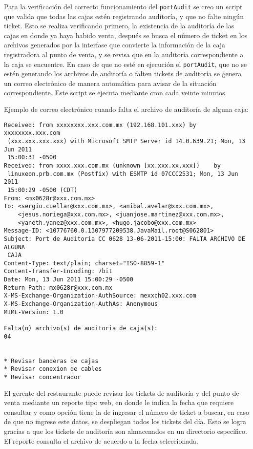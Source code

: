 Para la verificación del correcto funcionamiento del \texttt{portAudit} se creo un script que valida que todas las cajas estén registrando auditoría, y que no falte ningún ticket. Esto se realiza verificando primero, la existencia de la auditoría de las cajas en donde ya haya habido venta, después se busca el número de ticket en los archivos generados por la interfase que convierte la información de la caja registradora al punto de venta, y se revisa que en la auditoría correspondiente a la caja se encuentre. En caso de que no esté en ejecución el \texttt{portAudit}, que no se estén generando los archivos de auditoría o falten tickets de auditoría se genera un correo electrónico de manera automática para avisar de la situación correspondiente. Este script se ejecuta mediante cron cada veinte minutos.

Ejemplo de correo electrónico cuando falta el archivo de auditoría de alguna caja:

\begin{Verbatim}[fontsize=\tiny]
Received: from xxxxxxxx.xxx.com.mx (192.168.101.xxx) by xxxxxxxx.xxx.com
 (xxx.xxx.xxx.xxx) with Microsoft SMTP Server id 14.0.639.21; Mon, 13 Jun 2011
 15:00:31 -0500
Received: from xxxx.xxx.com.mx (unknown [xx.xxx.xx.xxx])	by
 linuxeon.prb.com.mx (Postfix) with ESMTP id 07CCC2531;	Mon, 13 Jun 2011
 15:00:29 -0500 (CDT)
From: <mx0628r@xxx.com.mx>
To: <sergio.cuellar@xxx.com.mx>, <anibal.avelar@xxx.com.mx>,
	<jesus.noriega@xxx.com.mx>, <juanjose.martinez@xxx.com.mx>,
	<yaneth.yanez@xxx.com.mx>, <hugo.jacobo@xxx.com.mx>
Message-ID: <10776760.0.1307977209538.JavaMail.root@S062801>
Subject: Port de Auditoria CC 0628 13-06-2011-15:00: FALTA ARCHIVO DE ALGUNA
 CAJA
Content-Type: text/plain; charset="ISO-8859-1"
Content-Transfer-Encoding: 7bit
Date: Mon, 13 Jun 2011 15:00:29 -0500
Return-Path: mx0628r@xxx.com.mx
X-MS-Exchange-Organization-AuthSource: mexxch02.xxx.com
X-MS-Exchange-Organization-AuthAs: Anonymous
MIME-Version: 1.0

Falta(n) archivo(s) de auditoria de caja(s):
04


* Revisar banderas de cajas
* Revisar conexion de cables
* Revisar concentrador
\end{Verbatim}

El gerente del restaurante puede revisar los tickets de auditoría y del punto de venta mediante un reporte tipo web, en donde le indica la fecha que requiere consultar y como opción tiene la de ingresar el número de ticket a buscar, en caso de que no ingrese este datos, se despliegan todos los tickets del día. Esto se logra gracias a que los tickets de auditoría son almacenados en un directorio específico. El reporte consulta el archivo de acuerdo a la fecha seleccionada. 

